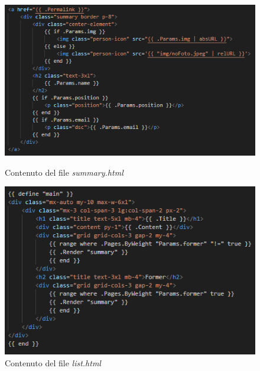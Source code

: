 \documentclass[target=bach,aauheader=]{thud}
\begin{document}
\begin{figure}[h]
    \begin{minipage}{0.5\textwidth}
      \centering
      \includegraphics[width=1\textwidth]{images/summary.png}
      \caption{Contenuto del file \textit{summary.html}}
      \label{img:summaryp}
    \end{minipage}
    \begin{minipage}{0.5\textwidth}
      \centering
      \includegraphics[width = 1\textwidth]{images/list.png}
      \caption{Contenuto del file \textit{list.html}}
      \label{img:listp}
    \end{minipage}
\end{figure}
\end{document}
